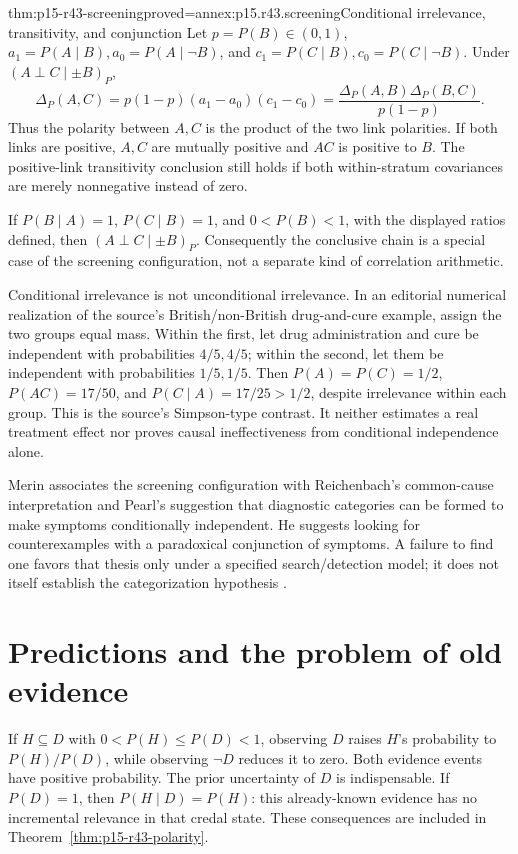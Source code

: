 \begin{hbtheorem}{thm:p15-r43-screening}{proved=annex:p15.r43.screening}{Conditional irrelevance, transitivity, and conjunction}
Let \(p=P(B)\in(0,1)\),
\(a_1=P(A\mid B),a_0=P(A\mid\neg B)\), and
\(c_1=P(C\mid B),c_0=P(C\mid\neg B)\).
Under \((A\perp C\mid\pm B)_P\),
\[
 \Delta_P(A,C)=p(1-p)(a_1-a_0)(c_1-c_0)
             =\frac{\Delta_P(A,B)\Delta_P(B,C)}{p(1-p)}.
\]
Thus the polarity between \(A,C\) is the product of the two link
polarities. If both links are positive, \(A,C\) are mutually positive
and \(AC\) is positive to \(B\). The positive-link transitivity
conclusion still holds if both within-stratum covariances are merely
nonnegative instead of zero.

If \(P(B\mid A)=1\), \(P(C\mid B)=1\), and \(0<P(B)<1\), with
the displayed ratios defined, then \((A\perp C\mid\pm B)_P\).
Consequently the conclusive chain is a special case of the screening
configuration, not a separate kind of correlation arithmetic.
\end{hbtheorem}

Conditional irrelevance is not unconditional irrelevance. In an editorial
numerical realization of the source's British/non-British drug-and-cure
example, assign the two groups equal mass. Within the first, let drug
administration and cure be independent with probabilities \(4/5,4/5\);
within the second, let them be independent with probabilities \(1/5,1/5\).
Then \(P(A)=P(C)=1/2\), \(P(AC)=17/50\), and
\(P(C\mid A)=17/25>1/2\), despite irrelevance within each group.
This is the source's Simpson-type contrast. It neither estimates a real
treatment effect nor proves causal ineffectiveness from conditional
independence alone.

Merin associates the screening configuration with Reichenbach's
common-cause interpretation and Pearl's suggestion that diagnostic
categories can be formed to make symptoms conditionally independent.
He suggests looking for counterexamples with a paradoxical conjunction
of symptoms. A failure to find one favors that thesis only under a
specified search/detection model; it does not itself establish the
categorization hypothesis
\parencite[p.~267 and p.~274, nn.~3--4]{Merin2021Relevance}.

\section{Predictions and the problem of old evidence}
\label{sec:p15-r43-old-evidence}

If \(H\subseteq D\) with \(0<P(H)\leq P(D)<1\), observing \(D\)
raises \(H\)'s probability to \(P(H)/P(D)\), while observing
\(\neg D\) reduces it to zero. Both evidence events have positive
probability. The prior uncertainty of \(D\) is indispensable. If
\(P(D)=1\), then \(P(H\mid D)=P(H)\): this already-known evidence
has no incremental relevance in that credal state. These consequences
are included in Theorem~\ref{thm:p15-r43-polarity}.

